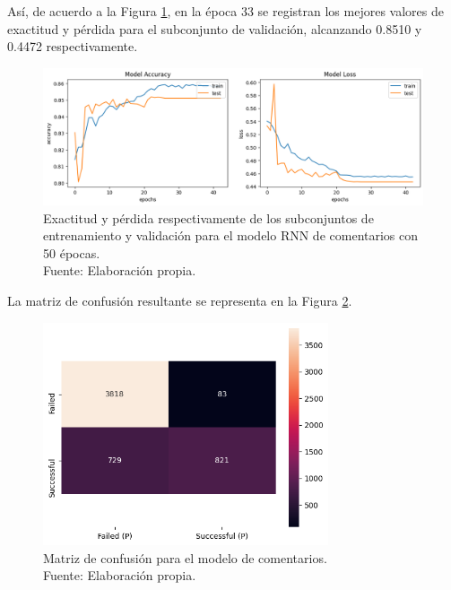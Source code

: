 Así, de acuerdo a la Figura \ref{5:fig7}, en la época 33 se registran los mejores valores de exactitud y pérdida para el subconjunto de validación, alcanzando 0.8510 y 0.4472 respectivamente.

\begin{figure}[!ht]
	\begin{center}
		\includegraphics[width=1\textwidth]{5/figures/comments_model_acc_loss.png}
		\caption[Exactitud y pérdida respectivamente de los subconjuntos de entrenamiento y validación para el modelo RNN de comentarios con 50 épocas]{Exactitud y pérdida respectivamente de los subconjuntos de entrenamiento y validación para el modelo RNN de comentarios con 50 épocas.\\
		Fuente: Elaboración propia.}
		\label{5:fig7}
	\end{center}
\end{figure}

La matriz de confusión resultante se representa en la Figura \ref{5:fig8}.
\begin{figure}[!ht]
	\begin{center}
		\includegraphics[width=0.75\textwidth]{5/figures/comments_confusion_matrix.png}
		\caption[Matriz de confusión para el modelo de comentarios]{Matriz de confusión para el modelo de comentarios.\\
		Fuente: Elaboración propia.}
		\label{5:fig8}
	\end{center}
\end{figure}


